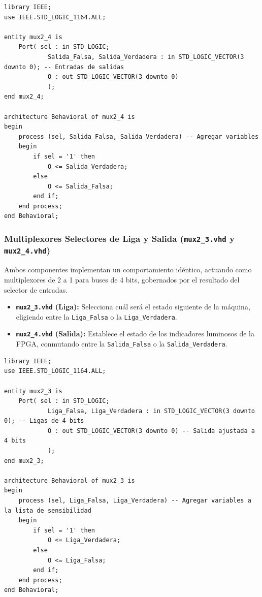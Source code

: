 \documentclass[12pt, letterpaper]{article}
\begin{document}
\begin{lstlisting}[style=vhdl, caption={Código completo del multiplexor selector de entradas.}, label={lst:mux4}]
library IEEE;
use IEEE.STD_LOGIC_1164.ALL;

entity mux2_4 is
	Port( sel : in STD_LOGIC;
			Salida_Falsa, Salida_Verdadera : in STD_LOGIC_VECTOR(3 downto 0); -- Entradas de salidas
			O : out STD_LOGIC_VECTOR(3 downto 0)
			);
end mux2_4;

architecture Behavioral of mux2_4 is
begin
	process (sel, Salida_Falsa, Salida_Verdadera) -- Agregar variables
	begin
		if sel = '1' then
			O <= Salida_Verdadera;
		else
			O <= Salida_Falsa;
		end if;
	end process;
end Behavioral;
\end{lstlisting}

\subsubsection*{Multiplexores Selectores de Liga y Salida (\texttt{mux2\_3.vhd} y \texttt{mux2\_4.vhd})}

Ambos componentes implementan un comportamiento idéntico, actuando como multiplexores de 2 a 1 para buses de 4 bits, gobernados por el resultado del selector de entradas.
\begin{itemize}
\item \textbf{\texttt{mux2\_3.vhd} (Liga):} Selecciona cuál será el estado siguiente de la máquina, eligiendo entre la \texttt{Liga\_Falsa} o la \texttt{Liga\_Verdadera}.
\item \textbf{\texttt{mux2\_4.vhd} (Salida):} Establece el estado de los indicadores luminosos de la FPGA, conmutando entre la \texttt{Salida\_Falsa} o la \texttt{Salida\_Verdadera}.
\end{itemize}

\begin{lstlisting}[style=vhdl, caption={Código completo del multiplexor selector de liga.}, label={lst:mux2_3}]
library IEEE;
use IEEE.STD_LOGIC_1164.ALL;

entity mux2_3 is
	Port( sel : in STD_LOGIC;
			Liga_Falsa, Liga_Verdadera : in STD_LOGIC_VECTOR(3 downto 0); -- Ligas de 4 bits
			O : out STD_LOGIC_VECTOR(3 downto 0) -- Salida ajustada a 4 bits
			);
end mux2_3;

architecture Behavioral of mux2_3 is
begin
	process (sel, Liga_Falsa, Liga_Verdadera) -- Agregar variables a la lista de sensibilidad
	begin
		if sel = '1' then
			O <= Liga_Verdadera;
		else
			O <= Liga_Falsa;
		end if;
	end process;
end Behavioral;
\end{lstlisting}
\end{document}
